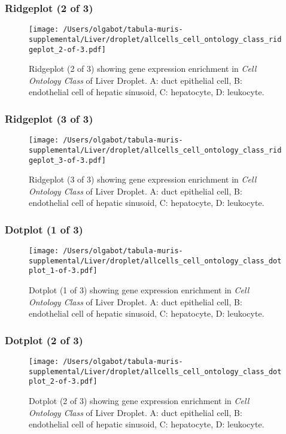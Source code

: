\clearpage

\subsubsection{Ridgeplot (2 of 3)}
\begin{figure}[h]
\centering
\texttt{[image: /Users/olgabot/tabula-muris-supplemental/Liver/droplet/allcells\_cell\_ontology\_class\_ridgeplot\_2-of-3.pdf]}

\caption{ Ridgeplot (2 of 3)  showing gene expression enrichment in \emph{Cell Ontology Class} of Liver Droplet. A: duct epithelial cell, B: endothelial cell of hepatic sinusoid, C: hepatocyte, D: leukocyte.}
\end{figure}


\clearpage

\subsubsection{Ridgeplot (3 of 3)}
\begin{figure}[h]
\centering
\texttt{[image: /Users/olgabot/tabula-muris-supplemental/Liver/droplet/allcells\_cell\_ontology\_class\_ridgeplot\_3-of-3.pdf]}

\caption{ Ridgeplot (3 of 3)  showing gene expression enrichment in \emph{Cell Ontology Class} of Liver Droplet. A: duct epithelial cell, B: endothelial cell of hepatic sinusoid, C: hepatocyte, D: leukocyte.}
\end{figure}


\clearpage

\subsubsection{Dotplot (1 of 3)}
\begin{figure}[h]
\centering
\texttt{[image: /Users/olgabot/tabula-muris-supplemental/Liver/droplet/allcells\_cell\_ontology\_class\_dotplot\_1-of-3.pdf]}

\caption{ Dotplot (1 of 3)  showing gene expression enrichment in \emph{Cell Ontology Class} of Liver Droplet. A: duct epithelial cell, B: endothelial cell of hepatic sinusoid, C: hepatocyte, D: leukocyte.}
\end{figure}


\clearpage

\subsubsection{Dotplot (2 of 3)}
\begin{figure}[h]
\centering
\texttt{[image: /Users/olgabot/tabula-muris-supplemental/Liver/droplet/allcells\_cell\_ontology\_class\_dotplot\_2-of-3.pdf]}

\caption{ Dotplot (2 of 3)  showing gene expression enrichment in \emph{Cell Ontology Class} of Liver Droplet. A: duct epithelial cell, B: endothelial cell of hepatic sinusoid, C: hepatocyte, D: leukocyte.}
\end{figure}



